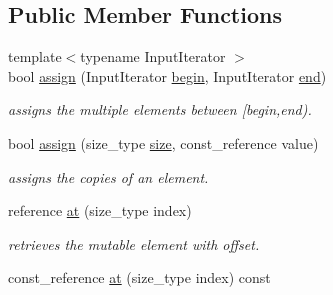 \subsection*{Public Member Functions}
\begin{DoxyCompactItemize}
\item 
\hypertarget{classhryky_1_1_vector_af06670e87dfdd1ae0afadafaeb6e504c}{{\footnotesize template$<$typename Input\-Iterator $>$ }\\bool \hyperlink{classhryky_1_1_vector_af06670e87dfdd1ae0afadafaeb6e504c}{assign} (Input\-Iterator \hyperlink{classhryky_1_1_vector_aa032aa9e48dce836e68434e6ad58f0f5}{begin}, Input\-Iterator \hyperlink{classhryky_1_1_vector_ae17851e0d811d052645dd6e5a507f365}{end})}\label{classhryky_1_1_vector_af06670e87dfdd1ae0afadafaeb6e504c}

\begin{DoxyCompactList}\small\item\em assigns the multiple elements between \mbox{[}begin,end). \end{DoxyCompactList}\item 
\hypertarget{classhryky_1_1_vector_aebecb6f0b81899b791a9ab577344042a}{bool \hyperlink{classhryky_1_1_vector_aebecb6f0b81899b791a9ab577344042a}{assign} (size\-\_\-type \hyperlink{classhryky_1_1_vector_a4bf9016a68dd7bf4967bf202b884a4fa}{size}, const\-\_\-reference value)}\label{classhryky_1_1_vector_aebecb6f0b81899b791a9ab577344042a}

\begin{DoxyCompactList}\small\item\em assigns the copies of an element. \end{DoxyCompactList}\item 
\hypertarget{classhryky_1_1_vector_ae825547a4a63bd87f8e2f782d6932156}{reference \hyperlink{classhryky_1_1_vector_ae825547a4a63bd87f8e2f782d6932156}{at} (size\-\_\-type index)}\label{classhryky_1_1_vector_ae825547a4a63bd87f8e2f782d6932156}

\begin{DoxyCompactList}\small\item\em retrieves the mutable element with offset. \end{DoxyCompactList}\item 
\hypertarget{classhryky_1_1_vector_a225bbcff00762d23e1978c51f9d25d68}{const\-\_\-reference \hyperlink{classhryky_1_1_vector_a225bbcff00762d23e1978c51f9d25d68}{at} (size\-\_\-type index) const }\label{classhryky_1_1_vector_a225bbcff00762d23e1978c51f9d25d68}


\end{DoxyCompactItemize}
